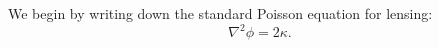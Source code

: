 We begin by writing down the standard Poisson equation for lensing:
\begin{equation}
\nabla^2 \phi = 2 \kappa.
\end{equation}
  